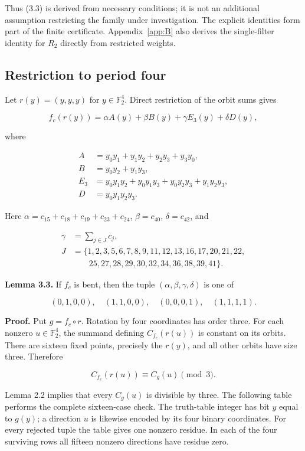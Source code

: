 \documentclass[pdflatex,sn-mathphys-num]{sn-jnl}
\begin{document}
Thus (3.3) is derived from necessary conditions; it is not an additional assumption restricting the family under investigation. The explicit identities form part of the finite certificate. Appendix~\ref{app:B} also derives the single-filter identity for $R_2$ directly from restricted weights.

\subsection{Restriction to period four}\label{subsec:3:3}

Let $r(y)=(y,y,y)$ for $y\in\mathbb F_2^4$. Direct restriction of the orbit sums gives

\[
f_c(r(y))=\alpha A(y)+\beta B(y)+\gamma E_3(y)+\delta D(y), \tag{3.4}
\]

where

\[
\begin{aligned}
A&=y_0y_1+y_1y_2+y_2y_3+y_3y_0,\\
B&=y_0y_2+y_1y_3,\\
E_3&=y_0y_1y_2+y_0y_1y_3+y_0y_2y_3+y_1y_2y_3,\\
D&=y_0y_1y_2y_3.
\end{aligned}
\]

Here $\alpha=c_{15}+c_{18}+c_{19}+c_{23}+c_{24}$, $\beta=c_{40}$, $\delta=c_{42}$, and

\[
\begin{aligned}\gamma&=\sum_{j\in J}c_j,\\J&=\{1,2,3,5,6,7,8,9,11,12,13,16,17,20,21,22,\\&\qquad25,27,28,29,30,32,34,36,38,39,41\}.\end{aligned} \tag{3.5}
\]

\textbf{Lemma 3.3.} If $f_c$ is bent, then the tuple $(\alpha,\beta,\gamma,\delta)$ is one of

\[
(0,1,0,0),\quad(1,1,0,0),\quad(0,0,0,1),\quad(1,1,1,1). \tag{3.6}
\]

\textbf{Proof.} Put $g=f_c\circ r$. Rotation by four coordinates has order three. For each nonzero $u\in\mathbb F_2^4$, the summand defining $C_{f_c}(r(u))$ is constant on its orbits. There are sixteen fixed points, precisely the $r(y)$, and all other orbits have size three. Therefore

\[
C_{f_c}(r(u))\equiv C_g(u)\pmod3. \tag{3.7}
\]

Lemma 2.2 implies that every $C_g(u)$ is divisible by three. The following table performs the complete sixteen-case check. The truth-table integer has bit $y$ equal to $g(y)$; a direction $u$ is likewise encoded by its four binary coordinates. For every rejected tuple the table gives one nonzero residue. In each of the four surviving rows all fifteen nonzero directions have residue zero.
\end{document}
